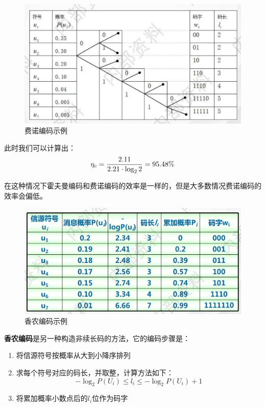 \documentclass[UTF8,a4paper,11pt]{article}
\begin{document}
\begin{figure}[htbp]
\centering
\includegraphics[scale=0.45]{p10.png}
\caption{费诺编码示例}
\end{figure}

此时我们可以计算出：
\begin{equation}
\notag
\eta_c=\frac{2.11}{2.21\cdot\log_{2}{2}}=95.48\%
\end{equation}

在这种情况下霍夫曼编码和费诺编码的效率是一样的，但是大多数情况费诺编码的效率会偏低。

\begin{figure}[htbp]
\centering
\includegraphics[scale=0.45]{p11.png}
\caption{香农编码示例}
\end{figure}

\textbf{香农编码}是另一种构造非续长码的方法，它的编码步骤是：
\begin{enumerate}
\item 将信源符号按概率从大到小降序排列

\item 求每个符号对应的码长，并取整，计算方法如下：
\begin{equation}
-\log_{2}{P(U_i)}\le l_i\le -\log_{2}{P(U_i)}+1
\end{equation}

\item 将累加概率小数点后的$l_i$位作为码字

\end{enumerate}
\end{document}
